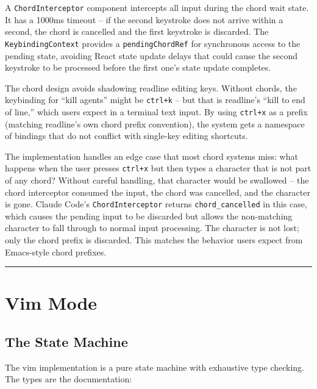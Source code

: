 \documentclass[
  english,
  11pt,
  letterpaper,
]{book}
\begin{document}
A \texttt{ChordInterceptor} component intercepts all input during the
chord wait state. It has a 1000ms timeout -- if the second keystroke
does not arrive within a second, the chord is cancelled and the first
keystroke is discarded. The \texttt{KeybindingContext} provides a
\texttt{pendingChordRef} for synchronous access to the pending state,
avoiding React state update delays that could cause the second keystroke
to be processed before the first one's state update completes.

The chord design avoids shadowing readline editing keys. Without chords,
the keybinding for ``kill agents'' might be \texttt{ctrl+k} -- but that
is readline's ``kill to end of line,'' which users expect in a terminal
text input. By using \texttt{ctrl+x} as a prefix (matching readline's
own chord prefix convention), the system gets a namespace of bindings
that do not conflict with single-key editing shortcuts.

The implementation handles an edge case that most chord systems miss:
what happens when the user presses \texttt{ctrl+x} but then types a
character that is not part of any chord? Without careful handling, that
character would be swallowed -- the chord interceptor consumed the
input, the chord was cancelled, and the character is gone. Claude Code's
\texttt{ChordInterceptor} returns \texttt{chord\_cancelled} in this
case, which causes the pending input to be discarded but allows the
non-matching character to fall through to normal input processing. The
character is not lost; only the chord prefix is discarded. This matches
the behavior users expect from Emacs-style chord prefixes.

\begin{center}\rule{0.5\linewidth}{0.5pt}\end{center}

\section{Vim Mode}\label{vim-mode}

\subsection{The State Machine}\label{the-state-machine}

The vim implementation is a pure state machine with exhaustive type
checking. The types are the documentation:
\end{document}
